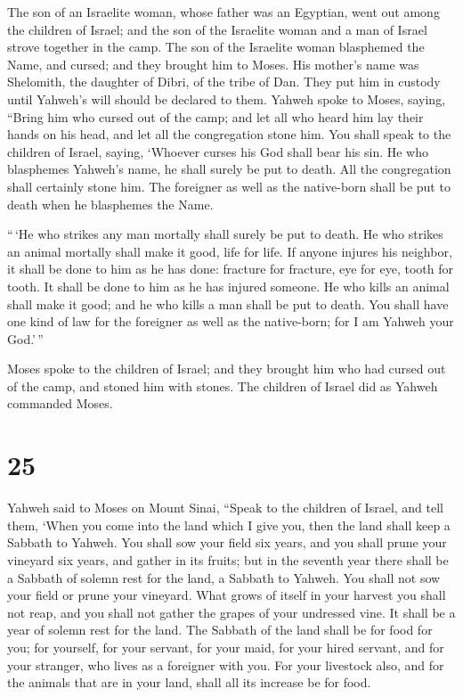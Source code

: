  The son of an Israelite woman, whose father was an
Egyptian, went out among the children of Israel; and the son of the
Israelite woman and a man of Israel strove together in the camp.
 The son of the Israelite woman blasphemed the Name, and
cursed; and they brought him to Moses. His mother's name was Shelomith,
the daughter of Dibri, of the tribe of Dan.  They put him
in custody until Yahweh's will should be declared to them. 
Yahweh spoke to Moses, saying,  ``Bring him who cursed out
of the camp; and let all who heard him lay their hands on his head, and
let all the congregation stone him.  You shall speak to the
children of Israel, saying, `Whoever curses his God shall bear his sin.
 He who blasphemes Yahweh's name, he shall surely be put to
death. All the congregation shall certainly stone him. The foreigner as
well as the native-born shall be put to death when he blasphemes the
Name.

 ``\,`He who strikes any man mortally shall surely be put
to death.  He who strikes an animal mortally shall make it
good, life for life.  If anyone injures his neighbor, it
shall be done to him as he has done:  fracture for
fracture, eye for eye, tooth for tooth. It shall be done to him as he
has injured someone.  He who kills an animal shall make it
good; and he who kills a man shall be put to death.  You
shall have one kind of law for the foreigner as well as the native-born;
for I am Yahweh your God.'\,''

 Moses spoke to the children of Israel; and they brought
him who had cursed out of the camp, and stoned him with stones. The
children of Israel did as Yahweh commanded Moses.

\hypertarget{section-24}{%
\section{25}\label{section-24}}

 Yahweh said to Moses on Mount Sinai,  ``Speak
to the children of Israel, and tell them, `When you come into the land
which I give you, then the land shall keep a Sabbath to Yahweh.
 You shall sow your field six years, and you shall prune
your vineyard six years, and gather in its fruits;  but in
the seventh year there shall be a Sabbath of solemn rest for the land, a
Sabbath to Yahweh. You shall not sow your field or prune your vineyard.
 What grows of itself in your harvest you shall not reap,
and you shall not gather the grapes of your undressed vine. It shall be
a year of solemn rest for the land.  The Sabbath of the land
shall be for food for you; for yourself, for your servant, for your
maid, for your hired servant, and for your stranger, who lives as a
foreigner with you.  For your livestock also, and for the
animals that are in your land, shall all its increase be for food.

